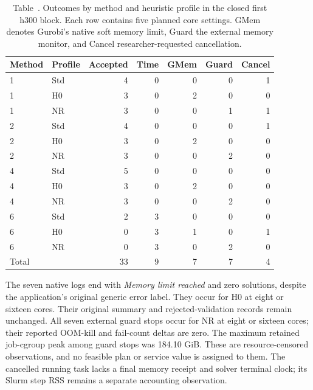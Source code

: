 \documentclass[
  english,
  11pt,
  a4paper,
]{article}
\begin{document}
\begin{table}[htbp]\centering\small
\caption{Table~\thetable. Outcomes by method and heuristic profile in the closed first h300 block. Each row contains five planned core settings. GMem denotes Gurobi's native soft memory limit, Guard the external memory monitor, and Cancel researcher-requested cancellation.}
\label{tab:c11-method}
\begin{tabular}{llrrrrr}\toprule
Method & Profile & Accepted & Time & GMem & Guard & Cancel\\\midrule
1 & Std & 4 & 0 & 0 & 0 & 1\\
1 & H0 & 3 & 0 & 2 & 0 & 0\\
1 & NR & 3 & 0 & 0 & 1 & 1\\
2 & Std & 4 & 0 & 0 & 0 & 1\\
2 & H0 & 3 & 0 & 2 & 0 & 0\\
2 & NR & 3 & 0 & 0 & 2 & 0\\
4 & Std & 5 & 0 & 0 & 0 & 0\\
4 & H0 & 3 & 0 & 2 & 0 & 0\\
4 & NR & 3 & 0 & 0 & 2 & 0\\
6 & Std & 2 & 3 & 0 & 0 & 0\\
6 & H0 & 0 & 3 & 1 & 0 & 1\\
6 & NR & 0 & 3 & 0 & 2 & 0\\
\midrule Total & & 33 & 9 & 7 & 7 & 4\\\bottomrule
\end{tabular}\end{table}

The seven native logs end with \emph{Memory limit reached} and zero solutions, despite the application's original generic error label. They occur for H0 at eight or sixteen cores. Their original summary and rejected-validation records remain unchanged. All seven external guard stops occur for NR at eight or sixteen cores; their reported OOM-kill and fail-count deltas are zero. The maximum retained job-cgroup peak among guard stops was 184.10 GiB. These are resource-censored observations, and no feasible plan or service value is assigned to them. The cancelled running task lacks a final memory receipt and solver terminal clock; its Slurm step RSS remains a separate accounting observation.
\end{document}
